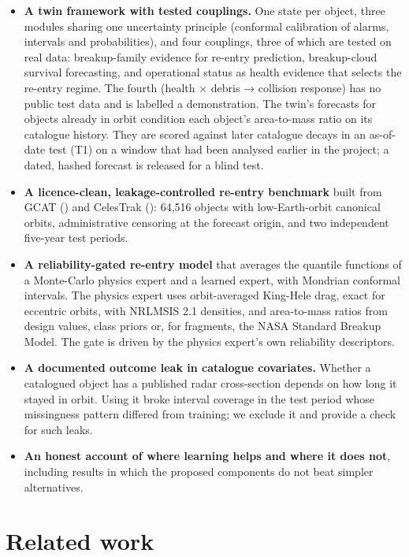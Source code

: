 \documentclass[
]{article}
\providecommand{\tightlist}{%
  \setlength{\itemsep}{0pt}\setlength{\parskip}{0pt}}
\begin{document}
\begin{itemize}
\tightlist
\item
  \textbf{A twin framework with tested couplings.} One state per object,
  three modules sharing one uncertainty principle (conformal calibration
  of alarms, intervals and probabilities), and four couplings, three of
  which are tested on real data: breakup-family evidence for re-entry
  prediction, breakup-cloud survival forecasting, and operational status
  as health evidence that selects the re-entry regime. The fourth
  (health × debris → collision response) has no public test data and is
  labelled a demonstration. The twin's forecasts for objects already in
  orbit condition each object's area-to-mass ratio on its catalogue
  history. They are scored against later catalogue decays in an
  as-of-date test (T1) on a window that had been analysed earlier in the
  project; a dated, hashed forecast is released for a blind test.
\item
  \textbf{A licence-clean, leakage-controlled re-entry benchmark} built
  from GCAT () and
  CelesTrak (): 64,516
  objects with low-Earth-orbit canonical orbits, administrative
  censoring at the forecast origin, and two independent five-year test
  periods.
\item
  \textbf{A reliability-gated re-entry model} that averages the quantile
  functions of a Monte-Carlo physics expert and a learned expert, with
  Mondrian conformal intervals. The physics expert uses orbit-averaged
  King-Hele drag, exact for eccentric orbits, with NRLMSIS 2.1
  densities, and area-to-mass ratios from design values, class priors
  or, for fragments, the NASA Standard Breakup Model. The gate is driven
  by the physics expert's own reliability descriptors.
\item
  \textbf{A documented outcome leak in catalogue covariates.} Whether a
  catalogued object has a published radar cross-section depends on how
  long it stayed in orbit. Using it broke interval coverage in the test
  period whose missingness pattern differed from training; we exclude it
  and provide a check for such leaks.
\item
  \textbf{An honest account of where learning helps and where it does
  not}, including results in which the proposed components do not beat
  simpler alternatives.
\end{itemize}

\section{Related work}\label{sec:related}
\end{document}
